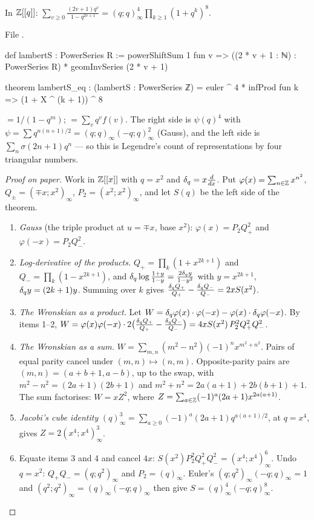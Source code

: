 \begin{theorem}\label{l25:thm:legendre}
In ${\mathbb{Z}}[[q]]$: $\displaystyle\sum_{v\ge0}\frac{(2v+1)q^v}{1-q^{2v+1}}=(q;q)_\infty^4\prod_{k\ge1}(1+q^k)^8$.
\end{theorem}
\noindent File .
\begin{leancode}
def lambertS : PowerSeries R :=
  powerShiftSum 1 fun v => ((2 * v + 1 : ℕ) : PowerSeries R) * geomInvSeries (2 * v + 1)

theorem lambertS_eq :
    (lambertS : PowerSeries ℤ) = euler ^ 4 * infProd fun k => (1 + X ^ (k + 1)) ^ 8
\end{leancode}
\begin{dictionary}
 $=1/(1-q^m)$;  $=\sum_vq^vf(v)$. The right side is
$\psi(q)^4$ with $\psi=\sum q^{n(n+1)/2}=(q;q)_\infty(-q;q)_\infty^2$ (Gauss), and the left side is
$\sum_n\sigma(2n+1)q^n$ --- so this is Legendre's count of representations by four triangular numbers.
\end{dictionary}
\begin{proof}[Proof on paper]
Work in ${\mathbb{Z}}[[x]]$ with $q=x^2$ and $\delta_q=x\frac d{dx}$. Put $\varphi(x)=\sum_{n\in{\mathbb{Z}}}x^{n^2}$,
$Q_\pm=(\mp x;x^2)_\infty$, $P_2=(x^2;x^2)_\infty$, and let $S(q)$ be the left side of the theorem.
\begin{enumerate}
\item \emph{Gauss} (the triple product at $u=\mp x$, base $x^2$): $\varphi(x)=P_2Q_+^2$ and $\varphi(-x)=P_2Q_-^2$.
\item \emph{Log-derivative of the products.} $Q_+=\prod_k(1+x^{2k+1})$ and $Q_-=\prod_k(1-x^{2k+1})$, and
  $\delta_q\log\frac{1+y}{1-y}=\frac{2\delta_q y}{1-y^2}$ with $y=x^{2k+1}$, $\delta_q y=(2k+1)y$.
  Summing over $k$ gives $\frac{\delta_q Q_+}{Q_+}-\frac{\delta_q Q_-}{Q_-}=2xS(x^2)$.
\item \emph{The Wronskian as a product.} Let $W=\delta_q\varphi(x)\cdot\varphi(-x)-\varphi(x)\cdot\delta_q\varphi(-x)$.
  By items 1--2, $W=\varphi(x)\varphi(-x)\cdot2\big(\frac{\delta_q Q_+}{Q_+}-\frac{\delta_q Q_-}{Q_-}\big)
  =4xS(x^2)\,P_2^2Q_+^2Q_-^2$.
\item \emph{The Wronskian as a sum.} $W=\sum_{m,n}(m^2-n^2)(-1)^nx^{m^2+n^2}$. Pairs of equal parity cancel under
  $(m,n)\mapsto(n,m)$. Opposite-parity pairs are $(m,n)=(a+b+1,a-b)$, up to the swap, with $m^2-n^2=(2a+1)(2b+1)$ and
  $m^2+n^2=2a(a+1)+2b(b+1)+1$. The sum factorises: $W=xZ^2$, where $Z=\sum_{a\in{\mathbb{Z}}}(-1)^a(2a+1)x^{2a(a+1)}$.
\item \emph{Jacobi's cube identity} $(q)_\infty^3=\sum_{a\ge0}(-1)^a(2a+1)q^{a(a+1)/2}$, at $q=x^4$, gives $Z=2(x^4;x^4)_\infty^3$.
\item Equate items 3 and 4 and cancel $4x$: $S(x^2)P_2^2Q_+^2Q_-^2=(x^4;x^4)^6_\infty$. Undo $q=x^2$: $Q_+Q_-=(q;q^2)_\infty$
  and $P_2=(q)_\infty$. Euler's $(q;q^2)_\infty(-q;q)_\infty=1$ and $(q^2;q^2)_\infty=(q)_\infty(-q;q)_\infty$ then give
  $S=(q)_\infty^4(-q;q)_\infty^8$.
\end{enumerate}
\end{proof}
